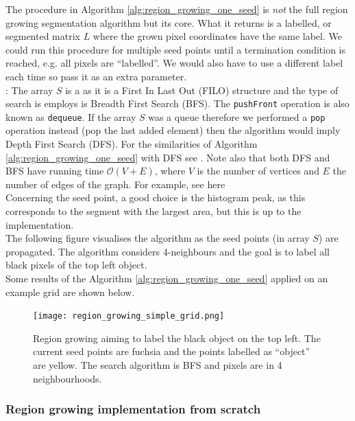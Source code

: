 \documentclass[a4paper]{article}
\begin{document}
The procedure in Algorithm \ref{alg:region_growing_one_seed} is \textit{not} the full region growing segmentation algorithm but its core. What it returns is a labelled, or segmented matrix $L$ where the grown pixel coordinates have the same label. We could run this procedure for multiple seed points until a termination condition is reached, e.g. all pixels are ``labelled''. We would also have to use a different label each time so pass it as an extra parameter.\\
: The array $S$ is a  as it is a First In Last Out (FILO) structure and the type of search is employs is Breadth First Search (BFS). The \texttt{pushFront} operation is also known as \texttt{dequeue}. If the array $S$ was a queue therefore we performed a \texttt{pop} operation instead (pop the last added element) then the algorithm would imply Depth First Search (DFS). For the similarities of Algorithm \ref{alg:region_growing_one_seed} with DFS see \cite{report_ghosh}. Note also that both DFS and BFS have running time $\mathcal{O}(V+E)$, where $V$ is the number of vertices and $E$ the number of edges of the graph. For example, see here \cite{online_time_bfs_example}\\
Concerning the seed point, a good choice is the histogram peak, as this corresponds to the segment with the largest area, but this is up to the implementation.\\
The following figure visualises the algorithm as the seed points (in array $S$) are propagated. The algorithm considers 4-neighbours and the goal is to label all black pixels of the top left object.\\
Some results of the Algorithm \ref{alg:region_growing_one_seed} applied on an example grid are shown below.
\begin{figure}[H]
	\centering %
	\texttt{[image: region\_growing\_simple\_grid.png]}
    \caption{ Region growing aiming to label the black object on the top left. The current seed points are fuchsia and the points labelled as ``object'' are yellow. The search algorithm is BFS and pixels are in 4 neighbourhoods.} 
\end{figure}



\subsubsection{Region growing implementation from scratch}
\end{document}
